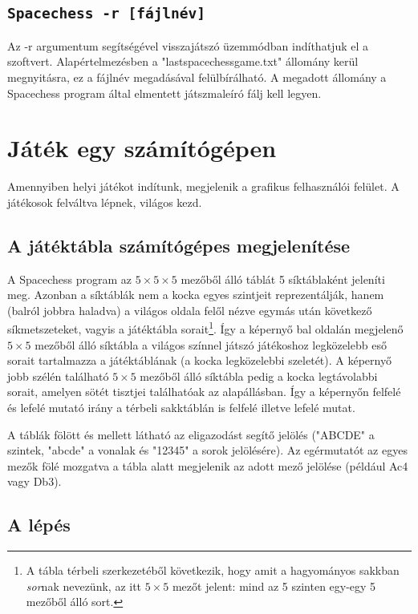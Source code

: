 \documentclass[12pt, twoside]{report}
\begin{document}
\subsection*{\tt Spacechess -r [fájlnév]}
Az -r argumentum segítségével visszajátszó üzemmódban indíthatjuk el a szoftvert. Alapértelmezésben a "lastspacechessgame.txt" állomány kerül megnyitásra, ez a fájlnév megadásával felülbírálható. A megadott állomány a Spacechess program által elmentett játszmaleíró fálj kell legyen.


\section{Játék egy számítógépen}

Amennyiben helyi játékot indítunk, megjelenik a grafikus felhasználói felület. A játékosok felváltva lépnek, világos kezd. 

\subsection{A játéktábla számítógépes megjelenítése}

A Spacechess program az $ 5 \times 5 \times 5 $ mezőből álló táblát 5 síktáblaként jeleníti meg. Azonban a síktáblák nem a kocka egyes szintjeit reprezentálják, hanem (balról jobbra haladva) a világos oldala felől nézve egymás után következő síkmetszeteket, vagyis a játéktábla sorait\footnote{A tábla térbeli szerkezetéből következik, hogy amit a hagyományos sakkban \textit{sor}nak nevezünk, az itt $ 5 \times 5 $ mezőt jelent: mind az 5 szinten egy-egy 5 mezőből álló sort.}. Így a képernyő bal oldalán megjelenő $ 5 \times 5 $ mezőből álló síktábla a világos színnel játszó játékoshoz legközelebb eső sorait tartalmazza a játéktáblának (a kocka legközelebbi szeletét). A képernyő jobb szélén található $ 5 \times 5 $ mezőből álló síktábla pedig a kocka legtávolabbi sorait, amelyen sötét tisztjei találhatóak az alapállásban. Így a képernyőn felfelé és lefelé mutató irány a térbeli sakktáblán is felfelé illetve lefelé mutat. 

A táblák fölött és mellett látható az eligazodást segítő jelölés ("ABCDE" a szintek, "abcde" a vonalak és "12345" a sorok jelölésére). Az egérmutatót az egyes mezők fölé mozgatva a tábla alatt megjelenik az adott mező jelölése (például Ac4 vagy Db3).

\subsection{A lépés}
\end{document}
